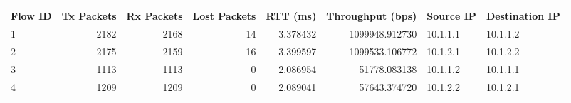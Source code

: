 \begin{tabular}{lrrrrrll}
\toprule
Flow ID & Tx Packets & Rx Packets & Lost Packets & RTT (ms) & Throughput (bps) & Source IP & Destination IP \\
\midrule
1 & 2182 & 2168 & 14 & 3.378432 & 1099948.912730 & 10.1.1.1 & 10.1.1.2 \\
2 & 2175 & 2159 & 16 & 3.399597 & 1099533.106772 & 10.1.2.1 & 10.1.2.2 \\
3 & 1113 & 1113 & 0 & 2.086954 & 51778.083138 & 10.1.1.2 & 10.1.1.1 \\
4 & 1209 & 1209 & 0 & 2.089041 & 57643.374720 & 10.1.2.2 & 10.1.2.1 \\
\bottomrule
\end{tabular}
